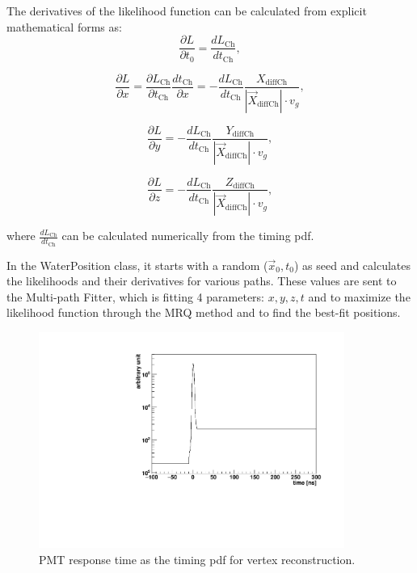 The derivatives of the likelihood function can be calculated from explicit mathematical forms as:
\[
\frac{\partial L}{\partial t_0}=\frac{dL_{\mathrm{Ch}}}{dt_{\mathrm{Ch}}},
\]

\[
\frac{\partial L}{\partial x}=\frac{\partial L_{\mathrm{Ch}}}{\partial t_{\mathrm{Ch}}}\frac{dt_{\mathrm{Ch}}}{\partial x}=-\frac{dL_{\mathrm{Ch}}}{dt_{\mathrm{Ch}}}\frac{X_{{\mathrm{diffCh}}}}{|\vec{X}_{{\mathrm{diffCh}}}|\cdot v_g},
\]

\[
\frac{\partial L}{\partial y}=-\frac{dL_{\mathrm{Ch}}}{dt_{\mathrm{Ch}}}\frac{Y_{{\mathrm{diffCh}}}}{|\vec{X}_{{\mathrm{diffCh}}}|\cdot v_g},
\]

\[
\frac{\partial L}{\partial z}=-\frac{dL_{\mathrm{Ch}}}{dt_{\mathrm{Ch}}}\frac{Z_{{\mathrm{diffCh}}}}{|\vec{X}_{{\mathrm{diffCh}}}|\cdot v_g},
\]

where $\frac{dL_{\mathrm{Ch}}}{dt_{\mathrm{Ch}}}$ can be calculated numerically from the timing pdf. 

In the WaterPosition class, it starts with a random ($\vec{x}_0,t_0$) as seed and calculates the likelihoods and their derivatives for various paths. These values are sent to the Multi-path Fitter, which is fitting 4 parameters: $x,y,z,t$ and to maximize the likelihood function through the MRQ method and to find the best-fit positions.


\begin{figure}[!htb]
	\centering
	\includegraphics[width=10cm]{MPW_timingPDF.pdf}
	\caption{PMT response time as the timing pdf for vertex reconstruction.}
	\label{MPW_timingPDF}
\end{figure}




